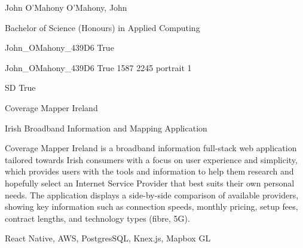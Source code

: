 
\begingroup{}\relax



\def\Key{John_OMahony_439D6}

{John O'Mahony}
{O'Mahony, John}

{Bachelor of Science (Honours) in Applied Computing}

{John_OMahony_439D6}
{True}

{John_OMahony_439D6}
{True}
{1587}
{2245}
{portrait}
{1}

{SD}
{True}

{Coverage Mapper Ireland}

{Irish Broadband Information and Mapping Application}

{Coverage Mapper Ireland is a broadband information full-stack web application tailored towards Irish consumers with a focus on user experience and simplicity, which provides users with the tools and information to help them research and hopefully select an Internet Service Provider that best suits their own personal needs. The application displays a side-by-side comparison of available providers, showing key information such as connection speeds, monthly pricing, setup fees, contract lengths, and technology types (fibre, 5G).}

{React Native, AWS, PostgresSQL, Knex.js, Mapbox GL}


